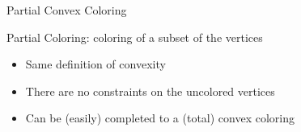\begin{frame}{Partial Convex Coloring}
\begin{definition}
\alert{Partial Coloring}: coloring of a subset of the vertices
\end{definition}

\begin{itemize}

\pause\item
Same definition of convexity

\pause\item
There are no constraints on the uncolored vertices

\end{itemize}
\pause

\begin{itemize}
\pause\item
Can be (easily) completed to a (total) convex coloring
\end{itemize}
\end{frame}
